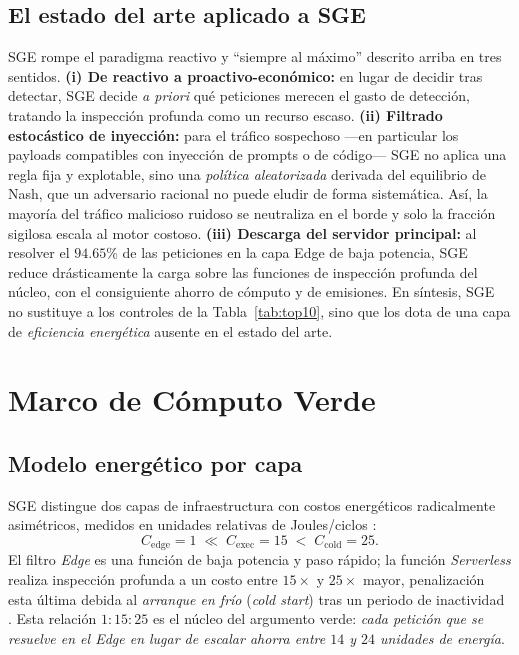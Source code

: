 \documentclass[10pt,twocolumn]{article}
\begin{document}
\subsection{El estado del arte aplicado a SGE}
\label{sec:sota-sge}
SGE rompe el paradigma reactivo y ``siempre al m\'aximo'' descrito arriba en tres
sentidos. \textbf{(i) De reactivo a proactivo-econ\'omico:} en lugar de decidir tras
detectar, SGE decide \emph{a priori} qu\'e peticiones merecen el gasto de detecci\'on,
tratando la inspecci\'on profunda como un recurso escaso. \textbf{(ii) Filtrado
estoc\'astico de inyecci\'on:} para el tr\'afico sospechoso ---en particular los payloads
compatibles con inyecci\'on de prompts o de c\'odigo--- SGE no aplica una regla fija y
explotable, sino una \emph{pol\'itica aleatorizada} derivada del equilibrio de Nash, que
un adversario racional no puede eludir de forma sistem\'atica. As\'i, la mayor\'ia del
tr\'afico malicioso ruidoso se neutraliza en el borde y solo la fracci\'on sigilosa
escala al motor costoso. \textbf{(iii) Descarga del servidor principal:} al resolver el
$94.65\%$ de las peticiones en la capa Edge de baja potencia, SGE reduce dr\'asticamente
la carga sobre las funciones de inspecci\'on profunda del n\'ucleo, con el consiguiente
ahorro de c\'omputo y de emisiones. En s\'intesis, SGE no sustituye a los controles de la
Tabla~\ref{tab:top10}, sino que los dota de una capa de \emph{eficiencia energ\'etica}
ausente en el estado del arte.

\section{Marco de C\'omputo Verde}
\label{sec:green}
\subsection{Modelo energ\'etico por capa}
SGE distingue dos capas de infraestructura con costos energ\'eticos radicalmente
asim\'etricos, medidos en unidades relativas de Joules/ciclos \cite{murugesan}:
\begin{equation}
\label{eq:energy}
C_{\text{edge}} = 1 \;\ll\; C_{\text{exec}} = 15 \;<\; C_{\text{cold}} = 25.
\end{equation}
El filtro \emph{Edge} es una funci\'on de baja potencia y paso r\'apido; la funci\'on
\emph{Serverless} realiza inspecci\'on profunda a un costo entre $15\times$ y
$25\times$ mayor, penalizaci\'on esta \'ultima debida al \emph{arranque en fr\'io}
(\emph{cold start}) tras un periodo de inactividad \cite{castro}. Esta relaci\'on
$1{:}15{:}25$ es el n\'ucleo del argumento verde: \emph{cada petici\'on que se
resuelve en el Edge en lugar de escalar ahorra entre $14$ y $24$ unidades de
energ\'ia}.
\end{document}
